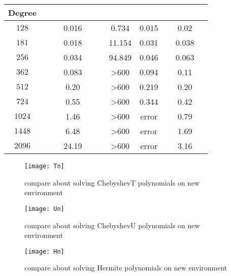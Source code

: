 \begin{table}[H]
	\centering
	\label{tab:and}
	\begin{tabular}{|| c| c| c| c| c ||}
		\hline
		
		\hline
		\scriptsize{Degree}  &\ \  \ \ \ \ \scriptsize{\froot}\ \  \ \  \ \   & \scriptsize{\REALROOT} &\scriptsize{\inte}  &\ \   \ \    \scriptsize{\AND}\ \ \ \   \\
		\hline
		$128$ & 0.016 & 0.734 &  0.015 &  0.02\\
		\hline
		$181$ & 0.018 & 11.154 & 0.031 & 0.038\\
		\hline
		$256$ & 0.034 & 94.849&  0.046  & 0.063\\
		\hline
		$362$ & 0.083 & >600&  0.094 & 0.11\\
		\hline
		$512$ & 0.20 &  >600 & 0.219 & 0.20  \\
		
		\hline
		$724$ & 0.55 &  >600&  0.344 & 0.42 \\
		
		\hline
		$1024$ & 1.46 & >600& {\color{red}error} & 0.79 \\
		
		\hline
		$1448$ & 6.48 &  >600&  {\color{red}error} &  1.69 \\
		\hline
		$2096$ & 24.19 &  >600&  {\color{red}error} & 3.16 \\	
		\hline
		
		\hline
	\end{tabular}%
\end{table}


\begin{figure}[!ht]
	\begin{centering}
		\texttt{[image: Tn]}
		\caption{ compare about solving ChebyshevT polynomials on new environment\label{fig:r}}
	\end{centering}
\end{figure}


\begin{figure}[!ht]
	\begin{centering}
		\texttt{[image: Un]}
		\caption{ compare about solving ChebyshevU polynomials on new environment\label{fig:u}}
	\end{centering}
\end{figure}


\begin{figure}[!ht]
	\begin{centering}
		\texttt{[image: Hn]}
		\caption{ compare about solving Hermite polynomials on new environment\label{fig:h}}
	\end{centering}
\end{figure}


